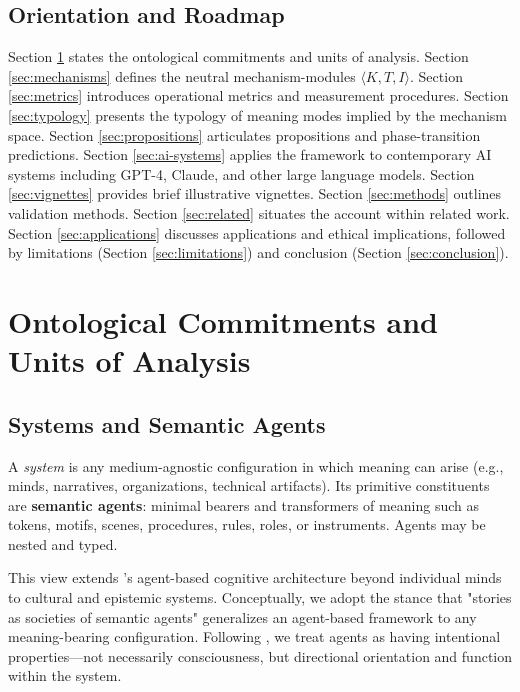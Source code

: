 \documentclass[12pt]{article}
\begin{document}
\subsection{Orientation and Roadmap}

Section \ref{sec:ontology} states the ontological commitments and units of analysis. Section \ref{sec:mechanisms} defines the neutral mechanism-modules $\langle K, T, I \rangle$. Section \ref{sec:metrics} introduces operational metrics and measurement procedures. Section \ref{sec:typology} presents the typology of meaning modes implied by the mechanism space. Section \ref{sec:propositions} articulates propositions and phase-transition predictions. Section \ref{sec:ai-systems} applies the framework to contemporary AI systems including GPT-4, Claude, and other large language models. Section \ref{sec:vignettes} provides brief illustrative vignettes. Section \ref{sec:methods} outlines validation methods. Section \ref{sec:related} situates the account within related work. Section \ref{sec:applications} discusses applications and ethical implications, followed by limitations (Section \ref{sec:limitations}) and conclusion (Section \ref{sec:conclusion}).

\section{Ontological Commitments and Units of Analysis}
\label{sec:ontology}

\subsection{Systems and Semantic Agents}

A \textit{system} is any medium-agnostic configuration in which meaning can arise (e.g., minds, narratives, organizations, technical artifacts). Its primitive constituents are \textbf{semantic agents}: minimal bearers and transformers of meaning such as tokens, motifs, scenes, procedures, rules, roles, or instruments. Agents may be nested and typed.

This view extends \citet{minsky1988society}'s agent-based cognitive architecture beyond individual minds to cultural and epistemic systems. Conceptually, we adopt the stance that "stories as societies of semantic agents" generalizes an agent-based framework to any meaning-bearing configuration. Following \citet{dennett1987intentional}, we treat agents as having intentional properties—not necessarily consciousness, but directional orientation and function within the system.
\end{document}
